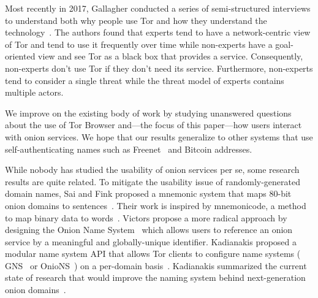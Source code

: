 Most recently in 2017, Gallagher \ea conducted a series of semi-structured
interviews to understand both why people use Tor and how they understand the
technology~\cite{Gallagher2017a}.  The authors found that experts tend to have a
network-centric view of Tor and tend to use it frequently over time while
non-experts have a goal-oriented view and see Tor as a black box that provides a
service.  Consequently, non-experts don't use Tor if they don't need its
service.  Furthermore, non-experts tend to consider a single threat while the
threat model of experts contains multiple actors.

We improve on the existing body of work by studying unanswered questions about
the use of Tor Browser and---the focus of this paper---how users interact with
onion services.  We hope that our results generalize to other systems that use
self-authenticating names such as Freenet~\cite{Freenet} and Bitcoin addresses.

While nobody has studied the usability of onion services per se, some research
results are quite related.  To mitigate the usability issue of
randomly-generated domain names, Sai and Fink proposed a mnemonic system that
maps 80-bit onion domains to sentences~\cite{Sai2012a}.  Their work is inspired
by mnemonicode, a method to map binary data to words~\cite{mnemonicode}.
Victors \ea propose a more radical approach by designing the Onion Name
System~\cite{Victors2017a} which allows users to reference an onion service by a
meaningful and globally-unique identifier.  Kadianakis \ea proposed a modular
name system API that allows Tor clients to configure name systems (\eg
GNS~\cite{Schanzenbach2012a} or OnioNS~\cite{Victors2017a}) on a per-domain
basis~\cite{Kadianakis2016a}.  Kadianakis summarized the current state of
research that would improve the naming system behind next-generation onion
domains~\cite{Kadianakis2017a}.

